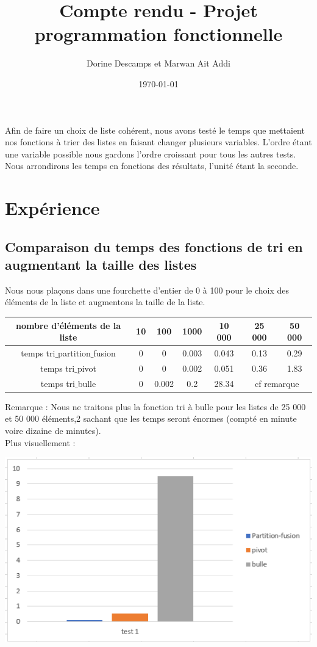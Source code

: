 \documentclass[a4paper, 12pt]{article}
\title{Compte rendu - Projet programmation fonctionnelle}
\author{Dorine Descamps et Marwan Ait Addi}
\date{\today}
\begin{document}
\maketitle
\tableofcontents
\newpage

Afin de faire un choix de liste cohérent, nous avons testé le temps que mettaient nos fonctions à trier des listes en faisant changer plusieurs variables. L'ordre étant une variable possible nous gardons l'ordre croissant pour tous les autres tests. Nous arrondirons les temps en fonctions des résultats, l'unité étant la seconde.

\section{Expérience}

\subsection{Comparaison du temps des fonctions de tri en augmentant la taille des listes}

Nous nous plaçons dans une fourchette d'entier de 0 à 100 pour le choix des éléments de la liste et augmentons la taille de la liste.
\begin{center}
\begin{tabular}{|c|c|c|c|c|c|c|}
\hline 
nombre d'éléments de la liste & 10 & 100 & 1000 & 10 000 & 25 000 & 50 000 \\ 
\hline 
temps tri$\_$partition$\_$fusion & 0 & 0 & 0.003 & 0.043 & 0.13 & 0.29 \\ 
\hline 
temps tri$\_$pivot & 0 & 0 & 0.002 & 0.051 & 0.36 & 1.83 \\ 
\hline 
temps tri$\_$bulle & 0 & 0.002 & 0.2 & 28.34 & \multicolumn{2}{c|}{cf remarque} \\ 
\hline
\end{tabular}
\end{center} 

Remarque : Nous ne traitons plus la fonction tri à bulle pour les listes de 25 000 et 50 000 éléments,2 sachant que les temps seront énormes (compté en minute voire dizaine de minutes). \\

Plus visuellement : 
\begin{center}
\includegraphics[scale=1]{graphique/test1.PNG} 
\end{center}
\end{document}
